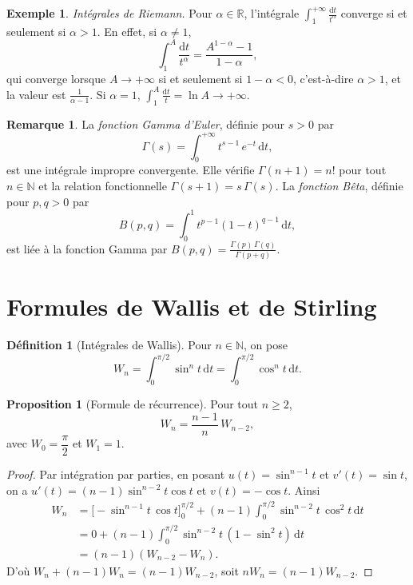 \documentclass[12pt,a4paper,openany]{book}
\theoremstyle{definition}
\newtheorem{definition}{Définition}[chapter]
\newtheorem{proposition}{Proposition}[chapter]
\newtheorem{remarque}{Remarque}[chapter]
\newtheorem{exemple}{Exemple}[chapter]
\newcommand{\N}{\mathbb{N}}
\newcommand{\R}{\mathbb{R}}
\newcommand{\dd}{\mathrm{d}}
\begin{document}
\begin{exemple}\label{ex:riemann-integrale}
  \emph{Intégrales de Riemann.} Pour $\alpha \in \R$, l'intégrale $\displaystyle\int_1^{+\infty}\frac{\dd t}{t^\alpha}$ converge si et seulement si $\alpha > 1$. En effet, si $\alpha \neq 1$,
  \[
    \int_1^A \frac{\dd t}{t^\alpha} = \frac{A^{1-\alpha} - 1}{1-\alpha},
  \]
  qui converge lorsque $A \to +\infty$ si et seulement si $1 - \alpha < 0$, c'est-à-dire $\alpha > 1$, et la valeur est $\frac{1}{\alpha - 1}$. Si $\alpha = 1$, $\int_1^A \frac{\dd t}{t} = \ln A \to +\infty$.
\end{exemple}

\begin{remarque}\label{rem:gamma-beta}
  La \emph{fonction Gamma d'Euler}, définie pour $s > 0$ par
  \[
    \Gamma(s) = \int_0^{+\infty} t^{s-1}\,e^{-t}\,\dd t,
  \]
  est une intégrale impropre convergente. Elle vérifie $\Gamma(n+1) = n!$ pour tout $n \in \N$ et la relation fonctionnelle $\Gamma(s+1) = s\,\Gamma(s)$. La \emph{fonction Bêta}, définie pour $p, q > 0$ par
  \[
    B(p,q) = \int_0^1 t^{p-1}(1-t)^{q-1}\,\dd t,
  \]
  est liée à la fonction Gamma par $B(p,q) = \frac{\Gamma(p)\,\Gamma(q)}{\Gamma(p+q)}$.
\end{remarque}

\section{Formules de Wallis et de Stirling}
\label{sec:wallis-stirling}

\begin{definition}[Intégrales de Wallis]\label{def:wallis}
  Pour $n \in \N$, on pose
  \[
    W_n = \int_0^{\pi/2} \sin^n t\,\dd t = \int_0^{\pi/2} \cos^n t\,\dd t.
  \]
\end{definition}

\begin{proposition}[Formule de récurrence]\label{prop:wallis-recurrence}
  Pour tout $n \geqslant 2$,
  \[
    W_n = \frac{n-1}{n}\,W_{n-2},
  \]
  avec $W_0 = \dfrac{\pi}{2}$ et $W_1 = 1$.
\end{proposition}

\begin{proof}
  Par intégration par parties, en posant $u(t) = \sin^{n-1}t$ et $v'(t) = \sin t$, on a $u'(t) = (n-1)\sin^{n-2}t\cos t$ et $v(t) = -\cos t$. Ainsi
  \begin{align*}
    W_n &= \bigl[-\sin^{n-1}t\,\cos t\bigr]_0^{\pi/2} + (n-1)\int_0^{\pi/2}\sin^{n-2}t\,\cos^2 t\,\dd t \\
    &= 0 + (n-1)\int_0^{\pi/2}\sin^{n-2}t\,(1 - \sin^2 t)\,\dd t \\
    &= (n-1)(W_{n-2} - W_n).
  \end{align*}
  D'où $W_n + (n-1)W_n = (n-1)W_{n-2}$, soit $nW_n = (n-1)W_{n-2}$.
\end{proof}
\end{document}
